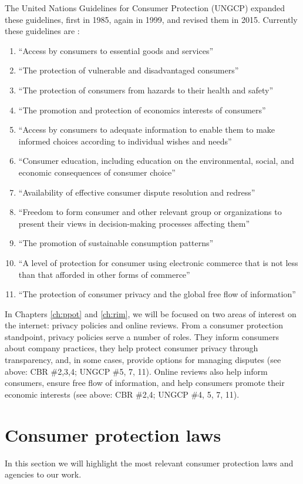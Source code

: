 The United Nations Guidelines for Consumer Protection (UNGCP) expanded these guidelines, first in 1985, again in 1999, and revised them in 2015. Currently these guidelines are \cite{un2003conpro}:
\begin{enumerate}
\item ``Access by consumers to essential goods and services''
\item ``The protection of vulnerable and disadvantaged consumers''
\item ``The protection of consumers from hazards to their health and safety''
\item ``The promotion and protection of economics interests of consumers''
\item ``Access by consumers to adequate information to enable them to make informed choices  according to individual wishes and needs''
\item ``Consumer education, including education on the environmental, social, and economic consequences of consumer choice''
\item ``Availability of effective consumer dispute resolution and redress''
\item ``Freedom to form consumer and other relevant group or organizations to present their views in decision-making processes affecting them''
\item ``The promotion of sustainable consumption patterns''
\item ``A level of protection for consumer using electronic commerce that is not less than that afforded in other forms of commerce''
\item ``The protection of consumer privacy and the global free flow of information''
\end{enumerate}

In Chapters \ref{ch:ppot} and \ref{ch:rim}, we will be focused on two areas of interest on the internet: privacy policies and online reviews. From a consumer protection standpoint, privacy policies serve a number of roles. They inform consumers about company practices, they help protect consumer privacy through transparency, and, in some cases, provide options for managing disputes (see above: CBR \#2,3,4; UNGCP \#5, 7, 11). Online reviews also help inform consumers, ensure free flow of information, and help consumers promote their economic interests (see above: CBR \#2,4; UNGCP \#4, 5, 7, 11). 


\section{Consumer protection laws} \label{sec:background:laws}
In this section we will highlight the most relevant consumer protection laws and agencies to our work.


